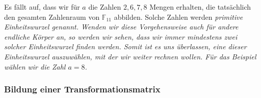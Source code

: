 Es fällt auf, dass wir für $a$ die Zahlen $2,6,7,8$ Mengen erhalten, die tatsächlich den gesamten Zahlenraum von $\mathbb{F}_{11}$ abbilden. Solche Zahlen werden \em primitive Einheitswurzel \em genannt. 
Wenden wir diese Vorgehensweise auch für andere endliche Körper an, so werden wir sehen, dass wir immer mindestens zwei solcher Einheitswurzel finden werden. Somit ist es uns überlassen, eine dieser Einheitswurzel auszuwählen, mit der wir weiter rechnen wollen. Für das Beispiel wählen wir die Zahl $a = 8$.

\subsubsection{Bildung einer Transformationsmatrix
	\label{reedsolomon:subsection:transMat}}

